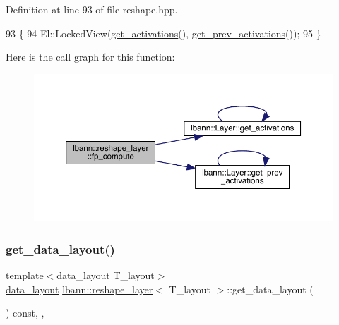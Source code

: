 Definition at line 93 of file reshape.\+hpp.


\begin{DoxyCode}
93                              \{
94     El::LockedView(\hyperlink{classlbann_1_1Layer_a1134b1a4385af199d7272c5aa827fa99}{get\_activations}(), \hyperlink{classlbann_1_1Layer_a45853df73a2e72bfaa774665a0f37ed7}{get\_prev\_activations}());
95   \}
\end{DoxyCode}
Here is the call graph for this function\+:\nopagebreak
\begin{figure}[H]
\begin{center}
\leavevmode
\includegraphics[width=350pt]{classlbann_1_1reshape__layer_a6a8567b61a1f911f52419ecd2346fcac_cgraph}
\end{center}
\end{figure}
\mbox{\label{classlbann_1_1reshape__layer_a5c3b5585fd6242de0630e643a4dfd992}} 
\subsubsection{\texorpdfstring{get\+\_\+data\+\_\+layout()}{get\_data\_layout()}}
{\footnotesize\ttfamily template$<$data\+\_\+layout T\+\_\+layout$>$ \\
\hyperlink{base_8hpp_a786677cbfb3f5677b4d84f3056eb08db}{data\+\_\+layout} \hyperlink{classlbann_1_1reshape__layer}{lbann\+::reshape\+\_\+layer}$<$ T\+\_\+layout $>$\+::get\+\_\+data\+\_\+layout (\begin{DoxyParamCaption}{ }\end{DoxyParamCaption}) const\hspace{0.3cm}{\ttfamily [inline]}, {\ttfamily [override]}, {\ttfamily [virtual]}}

